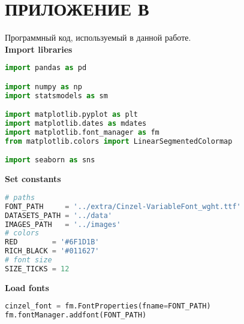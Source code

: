 \section*{ПРИЛОЖЕНИЕ В}



Программный код, используемый в данной работе.\\

{\noindent\hspace{-12.5pt}\normalsize\bfseries Import libraries}\vspace{-10pt}
\begin{center}
  \begin{lstlisting}[language=Python]
import pandas as pd

import numpy as np
import statsmodels as sm

import matplotlib.pyplot as plt
import matplotlib.dates as mdates
import matplotlib.font_manager as fm
from matplotlib.colors import LinearSegmentedColormap

import seaborn as sns
  \end{lstlisting}
\end{center}

{\noindent\hspace{-12.5pt}\normalsize\bfseries Set constants}\vspace{-10pt}
\begin{center}
  \begin{lstlisting}[language=Python]
# paths
FONT_PATH     = '../extra/Cinzel-VariableFont_wght.ttf'
DATASETS_PATH = '../data'
IMAGES_PATH   = '../images'
# colors
RED        = '#6F1D1B'
RICH_BLACK = '#011627'
# font size
SIZE_TICKS = 12
  \end{lstlisting}
\end{center}

{\noindent\hspace{-12.5pt}\normalsize\bfseries Load fonts}\vspace{-10pt}
\begin{center}
  \begin{lstlisting}[language=Python]
cinzel_font = fm.FontProperties(fname=FONT_PATH)
fm.fontManager.addfont(FONT_PATH)
  \end{lstlisting}
\end{center}

